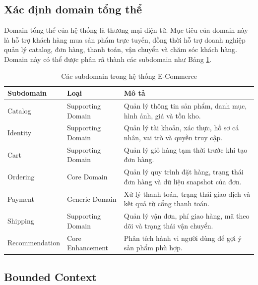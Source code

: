 \documentclass[../main.tex]{subfiles}
\begin{document}
\subsection{Xác định domain tổng thể}
\label{subsection:2.2.1}

Domain tổng thể của hệ thống là thương mại điện tử. Mục tiêu của domain này là hỗ trợ khách hàng mua sản phẩm trực tuyến, đồng thời hỗ trợ doanh nghiệp quản lý catalog, đơn hàng, thanh toán, vận chuyển và chăm sóc khách hàng. Domain này có thể được phân rã thành các subdomain như Bảng \ref{tab:chapter2-subdomains}.

\begin{table}[H]
    \centering
    \caption{Các subdomain trong hệ thống E-Commerce}
    \label{tab:chapter2-subdomains}
    \begin{tabular}{|p{}|p{}|p{}|}
        \hline
        \rowcolor{primary!35}
        \textbf{Subdomain} & \textbf{Loại} & \textbf{Mô tả} \\
        \hline
        Catalog & Supporting Domain & Quản lý thông tin sản phẩm, danh mục, hình ảnh, giá và tồn kho. \\
        \hline
        Identity & Supporting Domain & Quản lý tài khoản, xác thực, hồ sơ cá nhân, vai trò và quyền truy cập. \\
        \hline
        Cart & Supporting Domain & Quản lý giỏ hàng tạm thời trước khi tạo đơn hàng. \\
        \hline
        Ordering & Core Domain & Quản lý quy trình đặt hàng, trạng thái đơn hàng và dữ liệu snapshot của đơn. \\
        \hline
        Payment & Generic Domain & Xử lý thanh toán, trạng thái giao dịch và kết quả từ cổng thanh toán. \\
        \hline
        Shipping & Supporting Domain & Quản lý vận đơn, phí giao hàng, mã theo dõi và trạng thái vận chuyển. \\
        \hline
        Recommendation & Core Enhancement & Phân tích hành vi người dùng để gợi ý sản phẩm phù hợp. \\
        \hline
    \end{tabular}
\end{table}

\subsection{Bounded Context}
\label{subsection:2.2.2}
\end{document}
